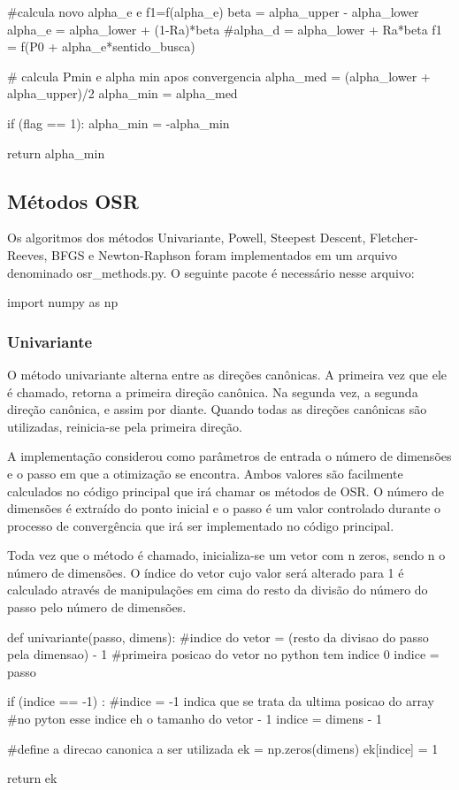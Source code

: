 \documentclass[10pt, a4paper]{article}
\begin{document}
\begin{python}
            #calcula novo alpha_e e f1=f(alpha_e)
            beta = alpha_upper - alpha_lower
            alpha_e = alpha_lower + (1-Ra)*beta
            #alpha_d = alpha_lower + Ra*beta 
            f1 = f(P0 + alpha_e*sentido_busca)
            
    # calcula Pmin e alpha min apos convergencia
    alpha_med = (alpha_lower + alpha_upper)/2
    alpha_min = alpha_med
    
    if (flag == 1):
        alpha_min = -alpha_min
    
    return alpha_min
\end{python}

\subsection{Métodos OSR}

Os algoritmos dos métodos Univariante, Powell, Steepest Descent, Fletcher-Reeves, BFGS e Newton-Raphson foram implementados em um arquivo denominado osr\_methods.py. O seguinte pacote é necessário nesse arquivo: 
\begin{python}
  import numpy as np
\end{python}

\subsubsection{Univariante}

O método univariante alterna entre as direções canônicas. A primeira vez que ele é chamado, retorna a primeira direção canônica. Na segunda vez, a segunda direção canônica, e assim por diante.
Quando todas as direções canônicas são utilizadas, reinicia-se pela primeira direção.

A implementação considerou como parâmetros de entrada o número de dimensões  e o passo em que a otimização se encontra. Ambos valores são facilmente calculados no código principal que irá chamar 
os métodos de OSR. O número de dimensões é extraído do ponto inicial e o passo é um valor controlado durante o processo de convergência que irá ser implementado no código principal.

Toda vez que o método é chamado, inicializa-se um vetor com n zeros, sendo n o número de dimensões. O índice do vetor cujo valor será alterado para 1 é calculado 
através de manipulações em cima do resto da divisão do número do passo pelo número de dimensões.

\begin{python}
  def univariante(passo, dimens):
    #indice do vetor = (resto da divisao do passo pela dimensao) - 1
    #primeira posicao do vetor no python tem indice 0
    indice = passo%
    
    if (indice == -1) :
        #indice = -1 indica que se trata da ultima posicao do array
        #no pyton esse indice eh o tamanho do vetor - 1
        indice = dimens - 1
        
    #define a direcao canonica a ser utilizada
    ek = np.zeros(dimens)
    ek[indice] = 1
    
    return ek
\end{python}
\end{document}
